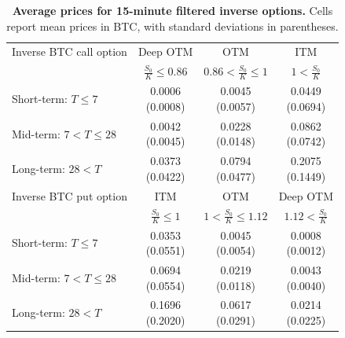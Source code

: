 \begin{table}[htbp]
\centering
\begin{tabular}{lccc}
\hline
Inverse BTC call option & Deep OTM & OTM & ITM \\
 & $\frac{S_0}{K} \leq 0.86$ & $0.86 < \frac{S_0}{K} \leq 1$ & $1 < \frac{S_0}{K}$ \\
\hline
Short-term: $T \leq 7$ & \makecell{0.0006\\(0.0008)} & \makecell{0.0045\\(0.0057)} & \makecell{0.0449\\(0.0694)} \\
Mid-term: $7 < T \leq 28$ & \makecell{0.0042\\(0.0045)} & \makecell{0.0228\\(0.0148)} & \makecell{0.0862\\(0.0742)} \\
Long-term: $28 < T$ & \makecell{0.0373\\(0.0422)} & \makecell{0.0794\\(0.0477)} & \makecell{0.2075\\(0.1449)} \\
\hline
Inverse BTC put option & ITM & OTM & Deep OTM \\
 & $\frac{S_0}{K} \leq 1$ & $1 < \frac{S_0}{K} \leq 1.12$ & $1.12 < \frac{S_0}{K}$ \\
\hline
Short-term: $T \leq 7$ & \makecell{0.0353\\(0.0551)} & \makecell{0.0045\\(0.0054)} & \makecell{0.0008\\(0.0012)} \\
Mid-term: $7 < T \leq 28$ & \makecell{0.0694\\(0.0554)} & \makecell{0.0219\\(0.0118)} & \makecell{0.0043\\(0.0040)} \\
Long-term: $28 < T$ & \makecell{0.1696\\(0.2020)} & \makecell{0.0617\\(0.0291)} & \makecell{0.0214\\(0.0225)} \\
\hline
\end{tabular}
\caption{\textbf{Average prices for 15-minute filtered inverse options.} Cells report mean prices in BTC, with standard deviations in parentheses.}
\label{tab:filtered_average_prices_inverse_options}
\end{table}

